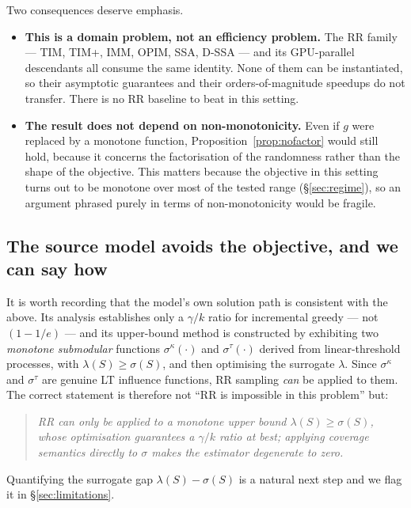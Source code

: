 Two consequences deserve emphasis.

\begin{itemize}
  \item \textbf{This is a domain problem, not an efficiency problem.} The RR family --- TIM,
        TIM+, IMM, OPIM, SSA, D-SSA --- and its GPU-parallel descendants all consume the same
        identity. None of them can be instantiated, so their asymptotic guarantees and their
        orders-of-magnitude speedups do not transfer. There is no RR baseline to beat in this
        setting.
  \item \textbf{The result does not depend on non-monotonicity.} Even if $g$ were replaced by a
        monotone function, Proposition~\ref{prop:nofactor} would still hold, because it concerns
        the factorisation of the randomness rather than the shape of the objective. This matters
        because the objective in this setting turns out to be monotone over most of the tested
        range (\S\ref{sec:regime}), so an argument phrased purely in terms of non-monotonicity
        would be fragile.
\end{itemize}

\subsection{The source model avoids the objective, and we can say how}

It is worth recording that the model's own solution path is consistent with the above. Its
analysis establishes only a $\gamma/k$ ratio for incremental greedy --- not $(1-1/e)$ --- and its
upper-bound method is constructed by exhibiting two \emph{monotone submodular} functions
$\sigma^\kappa(\cdot)$ and $\sigma^\tau(\cdot)$ derived from linear-threshold processes, with
$\lambda(S) \ge \sigma(S)$, and then optimising the surrogate $\lambda$. Since
$\sigma^\kappa$ and $\sigma^\tau$ are genuine LT influence functions, RR sampling \emph{can} be
applied to them. The correct statement is therefore not ``RR is impossible in this problem'' but:

\begin{quote}
\emph{RR can only be applied to a monotone upper bound $\lambda(S) \ge \sigma(S)$, whose
optimisation guarantees a $\gamma/k$ ratio at best; applying coverage semantics directly to
$\sigma$ makes the estimator degenerate to zero.}
\end{quote}

Quantifying the surrogate gap $\lambda(S) - \sigma(S)$ is a natural next step and we flag it in
\S\ref{sec:limitations}.

